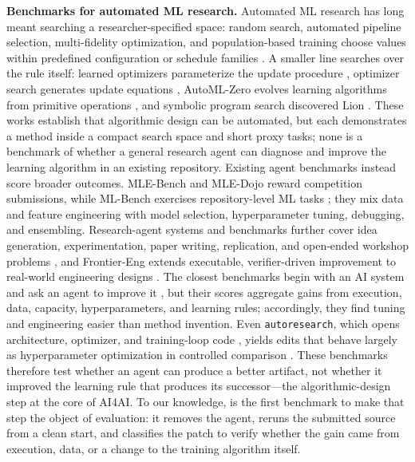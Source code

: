 \textbf{Benchmarks for automated ML research.}
Automated ML research has long meant searching a researcher-specified space: random search,
automated pipeline selection, multi-fidelity optimization, and population-based training choose
values within predefined configuration or schedule families \citep{bergstra2012random,
feurer2015autosklearn,li2018hyperband,falkner2018bohb,jaderberg2017pbt}.  A smaller line searches over
the rule itself: learned optimizers parameterize the update procedure
\citep{andrychowicz2016learning}, optimizer search generates update equations
\citep{bello2017optimizersearch}, AutoML-Zero evolves learning algorithms from primitive operations
\citep{real2020automlzero}, and symbolic program search discovered Lion
\citep{chen2023symbolic}.  These works establish that algorithmic design can be automated, but each
demonstrates a method inside a compact search space and short proxy tasks; none is a benchmark of
whether a general research agent can diagnose and improve the learning algorithm in an existing
repository.  Existing agent benchmarks instead score broader outcomes.  MLE-Bench and MLE-Dojo
reward competition submissions, while ML-Bench exercises repository-level ML tasks
\citep{chan2024mlebench,qiang2025mledojo,tang2023mlbench}; they mix data and feature engineering with
model selection, hyperparameter tuning, debugging, and ensembling.  Research-agent systems and
benchmarks further cover idea generation, experimentation, paper writing, replication, and
open-ended workshop problems \citep{lu2024aiscientist,yamada2025aiscientistv2,jiang2025aide,
chen2026mars,jin2026arbor,starace2025paperbench,kon2025expbench,chen2025mlrbench}, and Frontier-Eng
extends executable, verifier-driven improvement to real-world engineering designs
\citep{einsia2026frontiereng}.  The closest benchmarks begin with an AI system and ask an agent to
improve it \citep{huang2024mlagentbench,nathani2025mlgym,zhang2025mlrcbench,wijk2024rebench,
lyu2026mlsbench,chen2026agent2rlbench}, but their scores aggregate gains from execution, data,
capacity, hyperparameters, and learning rules; accordingly, they find tuning and engineering easier
than method invention.  Even \texttt{autoresearch}, which opens architecture, optimizer, and
training-loop code \citep{karpathy2026autoresearch}, yields edits that behave largely as
hyperparameter optimization in controlled comparison \citep{ferreira2026autoresearch}.  These
benchmarks therefore test whether an agent can produce a better artifact, not whether it improved
the learning rule that produces its successor---the algorithmic-design step at the core of AI4AI.
To our knowledge, \ai{} is the first benchmark to make that step the object of evaluation: it removes
the agent, reruns the submitted source from a clean start, and classifies the patch to verify whether
the gain came from execution, data, or a change to the training algorithm itself.
